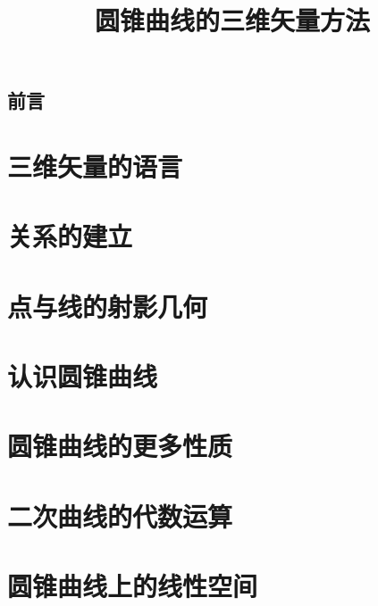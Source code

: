 \documentclass[11pt,openany]{ctexbook}
\begin{document}
\frontmatter
\title{\bfseries 圆锥曲线的三维矢量方法}
\author{}
\date{}
\maketitle

\chapter*{前言}


\tableofcontents

\mainmatter

\part{三维矢量的语言}

\part{关系的建立}

\part{点与线的射影几何}

\part{认识圆锥曲线}

\part{圆锥曲线的更多性质}

\part{二次曲线的代数运算}

\part{圆锥曲线上的线性空间}

\appendix

\end{document}
